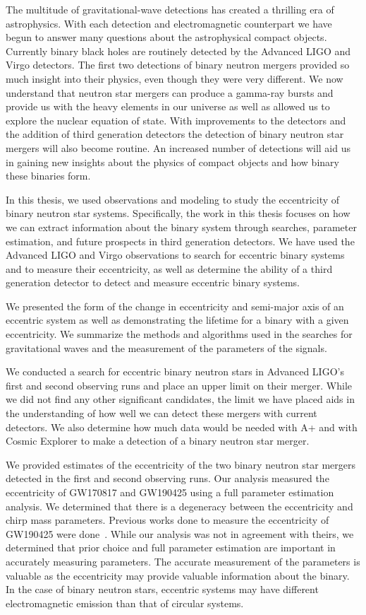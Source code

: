 The multitude of gravitational-wave detections has created a thrilling era of astrophysics. With each detection and electromagnetic counterpart we have begun to answer many questions about the astrophysical compact objects. Currently binary black holes are routinely detected by the Advanced LIGO and Virgo detectors. The first two detections of binary neutron mergers provided so much insight into their physics, even though they were very different. We now understand that neutron star mergers can produce a gamma-ray bursts and provide us with the heavy elements in our universe as well as allowed us to explore the nuclear equation of state. With improvements to the detectors and the addition of third generation detectors the detection of binary neutron star mergers will also become routine. An increased number of detections will aid us in gaining new insights about the physics of compact objects and how binary these binaries form.

In this thesis, we used observations and modeling to study the eccentricity of binary neutron star systems. Specifically, the work in this thesis focuses on how we can extract information about the binary system through searches, parameter estimation, and future prospects in third generation detectors. We have used the Advanced LIGO and Virgo observations to search for eccentric binary systems and to measure their eccentricity, as well as determine the ability of a third generation detector to detect and measure eccentric binary systems. 

We presented the form of the change in eccentricity and semi-major axis of an eccentric system as well as demonstrating the lifetime for a binary with a given eccentricity. We summarize the methods and algorithms used in the searches for gravitational waves and the measurement of the parameters of the signals.

We conducted a search for eccentric binary neutron stars in Advanced LIGO's first and second observing runs and place an upper limit on their merger. While we did not find any other significant candidates, the limit we have placed aids in the understanding of how well we can detect these mergers with current detectors. We also determine how much data would be needed with A+ and with Cosmic Explorer to make a detection of a binary neutron star merger. 

We provided estimates of the eccentricity of the two binary neutron star mergers detected in the first and second observing runs.
Our analysis measured the eccentricity of GW170817 and GW190425 using a full parameter estimation analysis. We determined that there is a degeneracy between the eccentricity and chirp mass parameters. Previous works done to measure the eccentricity of GW190425 were done~\cite{Romero-Shaw:2020aaj}. While our analysis was not in agreement with theirs, we determined that prior choice and full parameter estimation are important in accurately measuring parameters. The accurate measurement of the parameters is valuable as the eccentricity may provide valuable information about the binary. In the case of binary neutron stars, eccentric systems may have different electromagnetic emission than that of circular systems.

